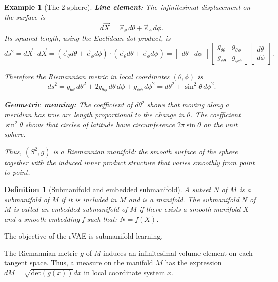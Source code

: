 \documentclass{article}
\newtheorem{definition}{Definition}
\newtheorem{example}{Example}
\begin{document}
\begin{example}[The 2-sphere]
\textbf{Line element:}  
The infinitesimal displacement on the surface is
\[
d\vec{X} = \vec{e}_\theta\, d\theta + \vec{e}_\phi\, d\phi.
\]
Its squared length, using the Euclidean dot product, is
\[
ds^2 = d\vec{X}\cdot d\vec{X}
= (\vec{e}_\theta d\theta + \vec{e}_\phi d\phi)\cdot(\vec{e}_\theta d\theta + \vec{e}_\phi d\phi)
= \begin{bmatrix}
d\theta & d\phi
\end{bmatrix}
\begin{bmatrix}
g_{\theta\theta} & g_{\theta\phi} \\
g_{\phi\theta} & g_{\phi\phi}
\end{bmatrix}
\begin{bmatrix}
d\theta \\
d\phi
\end{bmatrix}.
\]

Therefore the Riemannian metric in local coordinates \((\theta,\phi)\) is
\[
ds^2 = g_{\theta\theta}\, d\theta^2 + 2 g_{\theta\phi}\, d\theta\, d\phi
+ g_{\phi\phi}\, d\phi^2
= d\theta^2 + \sin^2\theta \, d\phi^2.
\]

\textbf{Geometric meaning:}  
The coefficient of \(d\theta^2\) shows that moving along a meridian 
has true arc length proportional to the change in \(\theta\).  
The coefficient \(\sin^2\theta\) shows that circles of latitude 
have circumference \(2\pi\sin\theta\) on the unit sphere.

Thus, \((S^2, g)\) is a Riemannian manifold: the smooth surface of the sphere together 
with the induced inner product structure that varies smoothly from point to point.
\end{example}



\begin{definition}[Submanifold and embedded submanifold]
A subset $N$ of $M$ is a submanifold of $M$ if it is included in $M$ and is a manifold. The submanifold $N$ of $M$ is
called an embedded submanifold of $M$ if there exists a smooth manifold $X$ and a smooth embedding f such that:
$N = f(X)$.
\end{definition}

The objective of the rVAE is submanifold learning.

The Riemannian metric $g$ of $M$ induces an infinitesimal volume element on each tangent space. Thus, a measure on
the manifold $M$ has the expression $dM = \sqrt{\textrm{det}(g(x))}dx$ in local coordinate system $x$.
\end{document}
